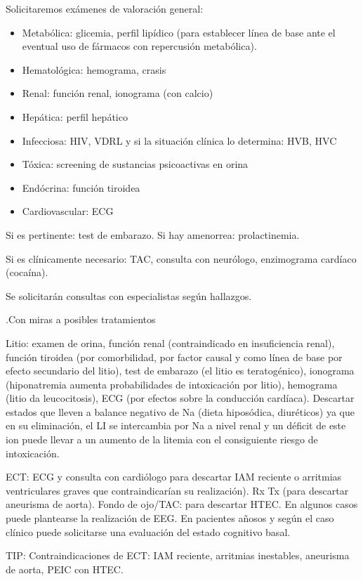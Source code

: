 \documentclass{scrbook}
\begin{document}
Solicitaremos exámenes de valoración general:
\begin{itemize}
	\item Metabólica: glicemia, perfil lipídico (para establecer línea de base ante el eventual uso de fármacos con repercusión metabólica).
	\item Hematológica: hemograma, crasis
	\item Renal: función renal, ionograma (con calcio)
	\item Hepática: perfil hepático
	\item Infecciosa: HIV, VDRL y si la situación clínica lo determina: HVB, HVC
	\item Tóxica: screening de sustancias psicoactivas en orina
	\item Endócrina: función tiroidea
	\item Cardiovascular: ECG
\end{itemize}
Si es pertinente: test de embarazo. Si hay amenorrea: prolactinemia.

Si es clínicamente necesario: TAC, consulta con neurólogo, enzimograma cardíaco (cocaína).

Se solicitarán consultas con especialistas según hallazgos.

.Con miras a posibles tratamientos

Litio: examen de orina, función renal (contraindicado en insuficiencia renal), función tiroidea (por comorbilidad, por factor causal y como línea de base por efecto secundario del litio), test de embarazo (el litio es teratogénico), ionograma (hiponatremia aumenta probabilidades de intoxicación por litio), hemograma (litio da leucocitosis), ECG (por efectos sobre la conducción cardíaca). Descartar estados que lleven a balance negativo de Na (dieta hiposódica, diuréticos) ya que en su eliminación, el LI se intercambia por Na a nivel renal y un déficit de este ion puede llevar a un aumento de la litemia con el consiguiente riesgo de intoxicación.

ECT: ECG y consulta con cardiólogo para descartar IAM reciente o arritmias ventriculares graves que contraindicarían su realización). Rx Tx (para descartar aneurisma de aorta). Fondo de ojo/TAC: para descartar HTEC. En algunos casos puede plantearse la realización de EEG. En pacientes añosos y según el caso clínico puede solicitarse una evaluación del estado cognitivo basal.

TIP: Contraindicaciones de ECT: IAM reciente, arritmias inestables, aneurisma de aorta, PEIC con HTEC.
\end{document}
